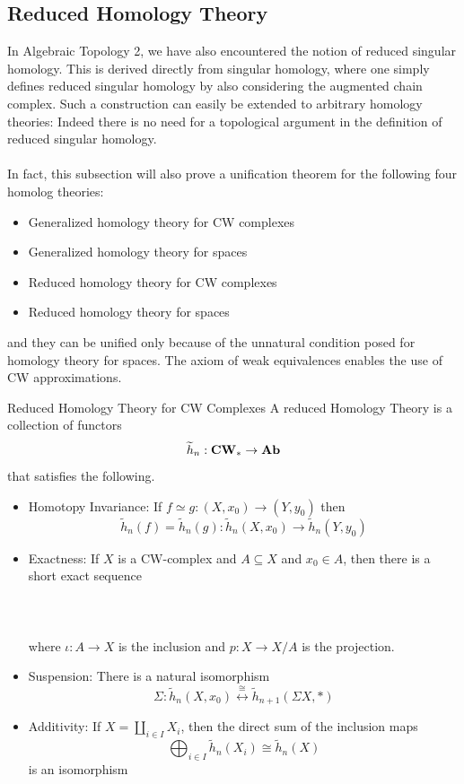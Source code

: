\documentclass[a4paper]{article}
\begin{document}
\subsection{Reduced Homology Theory}
In Algebraic Topology 2, we have also encountered the notion of reduced singular homology. This is derived directly from singular homology, where one simply defines reduced singular homology by also considering the augmented chain complex. Such a construction can easily be extended to arbitrary homology theories: Indeed there is no need for a topological argument in the definition of reduced singular homology. \\~\\

In fact, this subsection will also prove a unification theorem for the following four homolog theories: 
\begin{itemize}
\item Generalized homology theory for CW complexes
\item Generalized homology theory for spaces
\item Reduced homology theory for CW complexes
\item Reduced homology theory for spaces
\end{itemize}

and they can be unified only because of the unnatural condition posed for homology theory for spaces. The axiom of weak equivalences enables the use of CW approximations. 

\begin{defn}{Reduced Homology Theory for CW Complexes}{} A reduced Homology Theory is a collection of functors $$\widetilde{h}_n:\bold{CW}_\ast\to\bold{Ab}$$ that satisfies the following. 
\begin{itemize}
\item Homotopy Invariance: If $f\simeq g:(X,x_0)\to(Y,y_0)$ then $$\widetilde{h}_n(f)=\widetilde{h}_n(g):\widetilde{h}_n(X,x_0)\to\widetilde{h}_n(Y,y_0)$$
\item Exactness: If $X$ is a CW-complex and $A\subseteq X$ and $x_0\in A$, then there is a short exact sequence \\~\\
\\~\\
where $\iota:A\to X$ is the inclusion and $p:X\to X/A$ is the projection. 

\item Suspension: There is a natural isomorphism $$\Sigma:\widetilde{h}_n(X,x_0)\overset{\cong}{\longleftrightarrow}\widetilde{h}_{n+1}(\Sigma X,\ast)$$

\item Additivity: If $X=\coprod_{i\in I}X_i$, then the direct sum of the inclusion maps $$\bigoplus_{i\in I}\widetilde{h}_n(X_i)\cong\widetilde{h}_n(X)$$ is an isomorphism
\end{itemize}
\end{defn}
\end{document}
